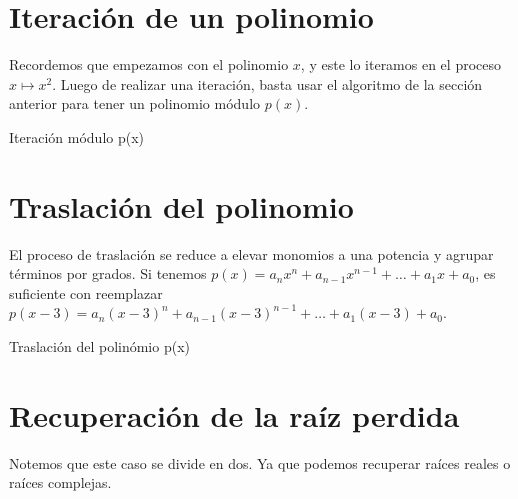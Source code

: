 \documentclass[oneside,11pt]{book}
\theoremstyle{definition}
\theoremstyle{plain}
\theoremstyle{remark}
\begin{document}
\section{Iteraci\'on de un polinomio}
Recordemos que empezamos con el polinomio $x$, y este lo iteramos en el proceso $x\mapsto x^2$. 
Luego de realizar una iteraci\'on, basta usar el algoritmo de la secci\'on anterior para tener un polinomio m\'odulo $p(x)$.

\begin{algorithm}[H]
 \caption{Iteraci\'on m\'odulo p(x)}
 
  \SetAlgoLined\DontPrintSemicolon
\end{algorithm}

\section{Traslaci\'on del polinomio}

El proceso de traslaci\'on se reduce a elevar monomios a una potencia y agrupar t\'erminos por grados.
Si tenemos $p(x)=a_nx^n+a_{n-1}x^{n-1}+\dots+a_1x+a_0$,
es suficiente con reemplazar $p(x-3)=a_n(x-3)^{n}+a_{n-1}(x-3)^{n-1}+\dots+a_1(x-3)+a_0$. 


\begin{algorithm}[H]
 \caption{Traslaci\'on del polin\'omio p(x)}
 
  \SetAlgoLined\DontPrintSemicolon
\end{algorithm}

\section{Recuperaci\'on de la ra\'iz perdida}

Notemos que este caso se divide en dos. 
Ya que podemos recuperar  ra\'ices reales o ra\'ices complejas.
\end{document}
